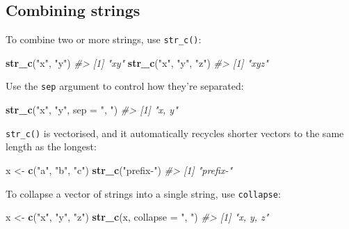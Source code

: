 \documentclass[]{book}
\newenvironment{Shaded}{\begin{snugshade}}{\end{snugshade}}
\newcommand{\KeywordTok}[1]{\textcolor[rgb]{0.13,0.29,0.53}{\textbf{#1}}}
\newcommand{\DataTypeTok}[1]{\textcolor[rgb]{0.13,0.29,0.53}{#1}}
\newcommand{\StringTok}[1]{\textcolor[rgb]{0.31,0.60,0.02}{#1}}
\newcommand{\CommentTok}[1]{\textcolor[rgb]{0.56,0.35,0.01}{\textit{#1}}}
\newcommand{\NormalTok}[1]{#1}
\begin{document}
\subsection{Combining strings}\label{combining-strings}

To combine two or more strings, use \texttt{str\_c()}:

\begin{Shaded}
\begin{Highlighting}[]
\KeywordTok{str_c}\NormalTok{(}\StringTok{"x"}\NormalTok{, }\StringTok{"y"}\NormalTok{)}
\CommentTok{#> [1] "xy"}
\KeywordTok{str_c}\NormalTok{(}\StringTok{"x"}\NormalTok{, }\StringTok{"y"}\NormalTok{, }\StringTok{"z"}\NormalTok{)}
\CommentTok{#> [1] "xyz"}
\end{Highlighting}
\end{Shaded}

Use the \texttt{sep} argument to control how they're separated:

\begin{Shaded}
\begin{Highlighting}[]
\KeywordTok{str_c}\NormalTok{(}\StringTok{"x"}\NormalTok{, }\StringTok{"y"}\NormalTok{, }\DataTypeTok{sep =} \StringTok{", "}\NormalTok{)}
\CommentTok{#> [1] "x, y"}
\end{Highlighting}
\end{Shaded}

\texttt{str\_c()} is vectorised, and it automatically recycles shorter
vectors to the same length as the longest:

\begin{Shaded}
\begin{Highlighting}[]
\NormalTok{x <-}\StringTok{ }\KeywordTok{c}\NormalTok{(}\StringTok{"a"}\NormalTok{, }\StringTok{"b"}\NormalTok{, }\StringTok{"c"}\NormalTok{)}
\KeywordTok{str_c}\NormalTok{(}\StringTok{"prefix-"}\NormalTok{)}
\CommentTok{#> [1] "prefix-"}
\end{Highlighting}
\end{Shaded}

To collapse a vector of strings into a single string, use
\texttt{collapse}:

\begin{Shaded}
\begin{Highlighting}[]
\NormalTok{x <-}\StringTok{ }\KeywordTok{c}\NormalTok{(}\StringTok{"x"}\NormalTok{, }\StringTok{"y"}\NormalTok{, }\StringTok{"z"}\NormalTok{)}
\KeywordTok{str_c}\NormalTok{(x, }\DataTypeTok{collapse =} \StringTok{", "}\NormalTok{)}
\CommentTok{#> [1] "x, y, z"}
\end{Highlighting}
\end{Shaded}
\end{document}
